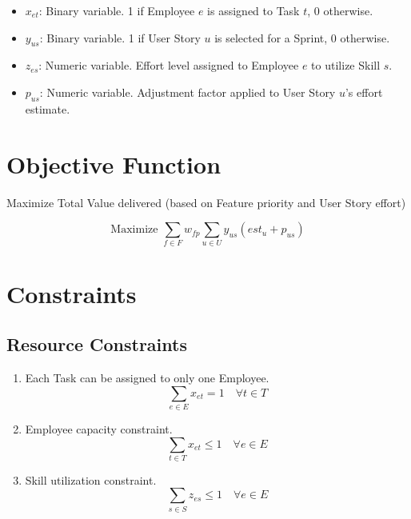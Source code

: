\documentclass{article}
\begin{document}
\begin{itemize}
    \item $x_{et}$: Binary variable. 1 if Employee $e$ is assigned to Task $t$, 0 otherwise.
    \item $y_{us}$: Binary variable. 1 if User Story $u$ is selected for a Sprint, 0 otherwise.
    \item $z_{es}$:  Numeric variable. Effort level assigned to Employee $e$ to utilize Skill $s$.
    \item $p_{us}$: Numeric variable. Adjustment factor applied to User Story $u$'s effort estimate.
\end{itemize}

\section{Objective Function}

Maximize Total Value delivered (based on Feature priority and User Story effort)

\begin{equation}
\text{Maximize } \sum_{f \in F} w_{fp} \sum_{u \in U} y_{us} (est_{u} + p_{us})
\end{equation}

\section{Constraints}

\subsection{Resource Constraints}

\begin{enumerate}
    \item Each Task can be assigned to only one Employee.
    \begin{equation}
    \sum_{e \in E} x_{et} = 1 \quad \forall t \in T
    \end{equation}
    \item Employee capacity constraint.
    \begin{equation}
    \sum_{t \in T} x_{et} \leq 1 \quad \forall e \in E
    \end{equation}
    \item Skill utilization constraint.
    \begin{equation}
    \sum_{s \in S} z_{es} \leq 1 \quad \forall e \in E
    \end{equation}
\end{enumerate}
\end{document}

